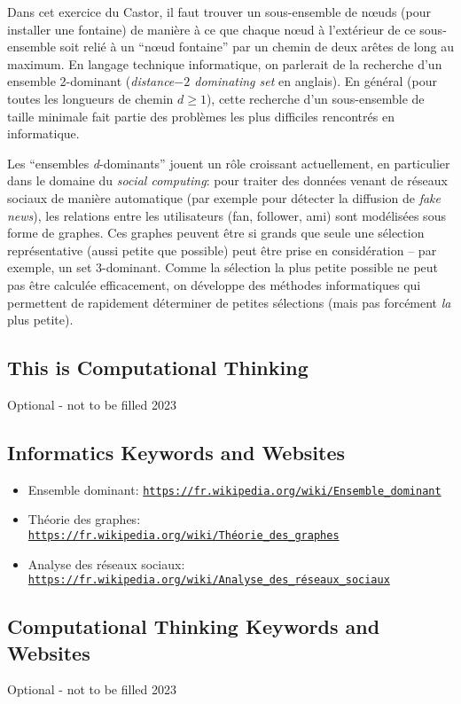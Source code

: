 \documentclass[a4paper,11pt]{report}
\newcommand{\BrochureUrlText}[1]{\texttt{#1}}
\begin{document}
Dans cet exercice du Castor, il faut trouver un sous-ensemble de nœuds (pour installer une fontaine) de manière à ce que chaque nœud à l’extérieur de ce sous-ensemble soit relié à un “nœud fontaine” par un chemin de deux arêtes de long au maximum. En langage technique informatique, on parlerait de la recherche d’un ensemble 2-dominant (\emph{distance$-2$ dominating set} en anglais). En général (pour toutes les longueurs de chemin ${d \geq 1}$), cette recherche d’un sous-ensemble de taille minimale fait partie des problèmes les plus difficiles rencontrés en informatique.

Les “ensembles \emph{d}-dominants” jouent un rôle croissant actuellement, en particulier dans le domaine du \emph{social computing}: pour traiter des données venant de réseaux sociaux de manière automatique (par exemple pour détecter la diffusion de \emph{fake news}), les relations entre les utilisateurs (fan, follower, ami) sont modélisées sous forme de graphes. Ces graphes peuvent être si grands que seule une sélection représentative (aussi petite que possible) peut être prise en considération – par exemple, un set 3-dominant. Comme la sélection la plus petite possible ne peut pas être calculée efficacement, on développe des méthodes informatiques qui permettent de rapidement déterminer de petites sélections (mais pas forcément \emph{la} plus petite).


\subsection*{This is Computational Thinking}

Optional - not to be filled 2023


\subsection*{Informatics Keywords and Websites}

\begin{itemize}
  \item Ensemble dominant: \href{https://fr.wikipedia.org/wiki/Ensemble_dominant}{\BrochureUrlText{https://fr.wikipedia.org/wiki/Ensemble\_dominant}}
  \item Théorie des graphes: \href{https://fr.wikipedia.org/wiki/Th\%C3\%A9orie_des_graphes}{\BrochureUrlText{https://fr.wikipedia.org/wiki/Théorie\_des\_graphes}}
  \item Analyse des réseaux sociaux: \href{https://fr.wikipedia.org/wiki/Analyse_des_r\%C3\%A9seaux_sociaux}{\BrochureUrlText{https://fr.wikipedia.org/wiki/Analyse\_des\_réseaux\_sociaux}}
\end{itemize}


\subsection*{Computational Thinking Keywords and Websites}

Optional - not to be filled 2023
\end{document}

